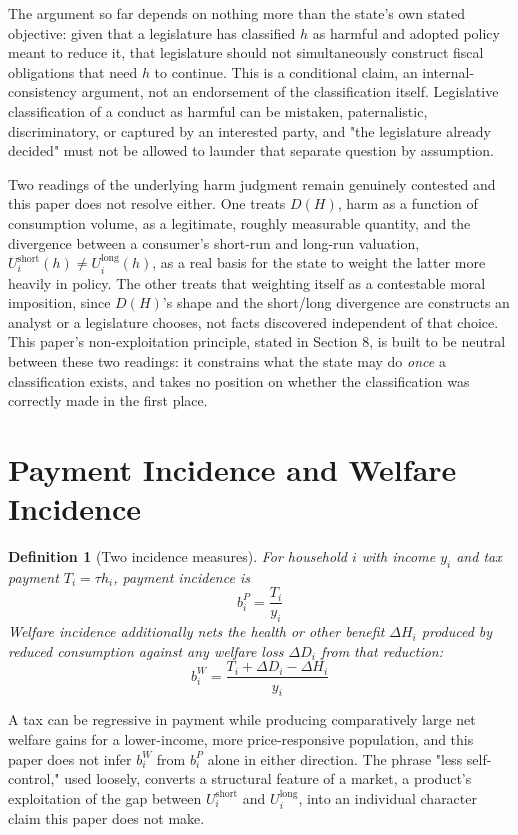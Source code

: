 \documentclass[11pt]{article}
\newtheorem{definition}{Definition}[section]
\begin{document}
The argument so far depends on nothing more than the state's own stated objective: given that a legislature has classified $h$ as harmful and adopted policy meant to reduce it, that legislature should not simultaneously construct fiscal obligations that need $h$ to continue. This is a conditional claim, an internal-consistency argument, not an endorsement of the classification itself. Legislative classification of a conduct as harmful can be mistaken, paternalistic, discriminatory, or captured by an interested party, and "the legislature already decided" must not be allowed to launder that separate question by assumption.

Two readings of the underlying harm judgment remain genuinely contested and this paper does not resolve either. One treats $D(H)$, harm as a function of consumption volume, as a legitimate, roughly measurable quantity, and the divergence between a consumer's short-run and long-run valuation, $U_i^{\text{short}}(h) \neq U_i^{\text{long}}(h)$, as a real basis for the state to weight the latter more heavily in policy. The other treats that weighting itself as a contestable moral imposition, since $D(H)$'s shape and the short/long divergence are constructs an analyst or a legislature chooses, not facts discovered independent of that choice. This paper's non-exploitation principle, stated in Section 8, is built to be neutral between these two readings: it constrains what the state may do \emph{once} a classification exists, and takes no position on whether the classification was correctly made in the first place.

\section{Payment Incidence and Welfare Incidence}

\begin{definition}[Two incidence measures]
For household $i$ with income $y_i$ and tax payment $T_i = \tau h_i$, payment incidence is
\[
b_i^P = \frac{T_i}{y_i}
\]
Welfare incidence additionally nets the health or other benefit $\Delta H_i$ produced by reduced consumption against any welfare loss $\Delta D_i$ from that reduction:
\[
b_i^W = \frac{T_i + \Delta D_i - \Delta H_i}{y_i}
\]
\end{definition}

A tax can be regressive in payment while producing comparatively large net welfare gains for a lower-income, more price-responsive population, and this paper does not infer $b_i^W$ from $b_i^P$ alone in either direction. The phrase "less self-control," used loosely, converts a structural feature of a market, a product's exploitation of the gap between $U_i^{\text{short}}$ and $U_i^{\text{long}}$, into an individual character claim this paper does not make.
\end{document}
